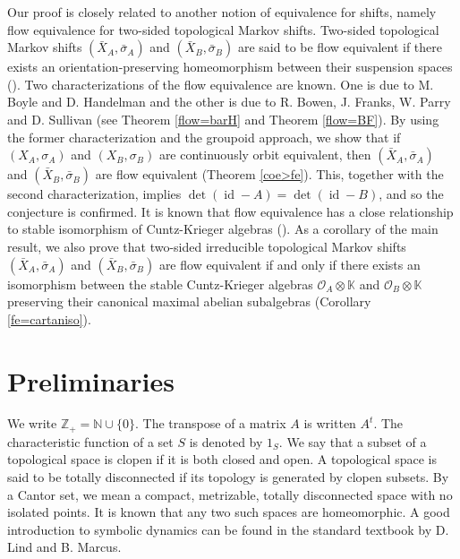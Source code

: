\documentclass[11pt]{article}
\theoremstyle{definition}
\numberwithin{equation}{section}
\newcommand{\id}{\operatorname{id}}
\newcommand{\K}{\mathbb{K}}
\newcommand{\N}{\mathbb{N}}
\newcommand{\Z}{\mathbb{Z}}
\begin{document}
Our proof is closely related to another notion of equivalence for shifts, 
namely flow equivalence for two-sided topological Markov shifts. 
Two-sided topological Markov shifts 
$(\bar X_A,\bar\sigma_A)$ and $(\bar X_B,\bar\sigma_B)$ are 
said to be flow equivalent 
if there exists an orientation-preserving homeomorphism 
between their suspension spaces (\cite{PS75Top}). 
Two characterizations of the flow equivalence are known. 
One is due to M. Boyle and D. Handelman \cite{BH96Israel} and 
the other is due to R. Bowen, J. Franks, W. Parry and D. Sullivan 
\cite{PS75Top,BF77Ann,F84ETDS} 
(see Theorem \ref{flow=barH} and Theorem \ref{flow=BF}). 
By using the former characterization and the groupoid approach, we show that 
if $(X_A,\sigma_A)$ and $(X_B,\sigma_B)$ are continuously orbit equivalent, 
then 
$(\bar X_A,\bar\sigma_A)$ and $(\bar X_B,\bar\sigma_B)$ are flow equivalent 
(Theorem \ref{coe>fe}). 
This, together with the second characterization, implies 
$\det(\id-A)=\det(\id-B)$, and so the conjecture is confirmed. 
It is known that flow equivalence has a close relationship to 
stable isomorphism of Cuntz-Krieger algebras 
(\cite{C81Invent,CK80Invent,F84ETDS,H94ETDS,H95crelle,R95K}). 
As a corollary of the main result, we also prove that 
two-sided irreducible topological Markov shifts 
$(\bar X_A,\bar\sigma_A)$ and $(\bar X_B,\bar\sigma_B)$ are flow equivalent 
if and only if there exists an isomorphism 
between the stable Cuntz-Krieger algebras 
$\mathcal{O}_A\otimes\K$ and $\mathcal{O}_B\otimes\K$ 
preserving their canonical maximal abelian subalgebras 
(Corollary \ref{fe=cartaniso}). 




\section{Preliminaries}




We write $\Z_+=\N\cup\{0\}$. 
The transpose of a matrix $A$ is written $A^t$. 
The characteristic function of a set $S$ is denoted by $1_S$. 
We say that a subset of a topological space is clopen 
if it is both closed and open. 
A topological space is said to be totally disconnected 
if its topology is generated by clopen subsets. 
By a Cantor set, 
we mean a compact, metrizable, totally disconnected space 
with no isolated points. 
It is known that any two such spaces are homeomorphic. 
A good introduction to symbolic dynamics can be found 
in the standard textbook \cite{LM} by D. Lind and B. Marcus. 
\end{document}
